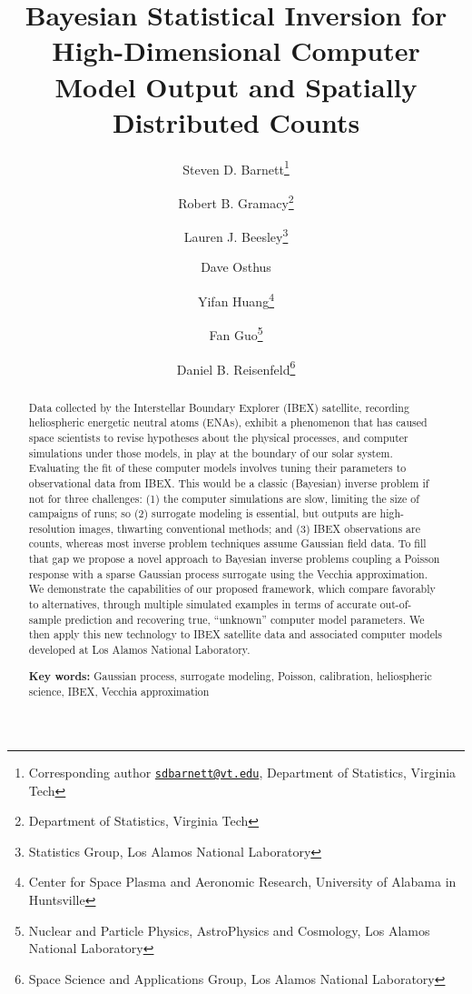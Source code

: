 \documentclass[11pt]{article}
\begin{document}
\title{Bayesian Statistical Inversion for High-Dimensional Computer Model
Output and Spatially Distributed Counts}
\author{Steven D. Barnett\thanks{Corresponding author
\href{mailto:sdbarnett@vt.edu}{\tt sdbarnett@vt.edu}, Department of Statistics,
Virginia Tech} \and Robert B. Gramacy\thanks{Department of Statistics, Virginia
Tech} \and Lauren J. Beesley\thanks{Statistics Group, Los Alamos National
Laboratory} \and Dave Osthus\footnotemark[3] \and Yifan Huang\thanks{ Center
for Space Plasma and Aeronomic Research, University of Alabama in Huntsville }
\and Fan Guo\thanks{Nuclear and Particle Physics, AstroPhysics and Cosmology,
Los Alamos National Laboratory} \and Daniel B. Reisenfeld\thanks{Space Science
and Applications Group, Los Alamos National Laboratory}}
\date{}

\maketitle

\begin{abstract}
Data collected by the Interstellar Boundary Explorer (IBEX) satellite,
recording heliospheric energetic neutral atoms (ENAs), exhibit a phenomenon
that has caused space scientists to revise hypotheses about the physical
processes, and computer simulations under those models, in play at the
boundary of our solar system.  Evaluating the fit of these computer models
involves tuning their parameters to observational data from IBEX. This would
be a classic (Bayesian) inverse problem if not for three challenges: (1) the
computer simulations are slow, limiting the size of campaigns of runs; so (2)
surrogate modeling is essential, but outputs are high-resolution images,
thwarting conventional methods; and (3) IBEX observations are counts, whereas
most inverse problem techniques assume Gaussian field data. To fill that gap
we propose a novel approach to Bayesian inverse problems coupling a Poisson
response with a sparse Gaussian process surrogate using the Vecchia
approximation.  We demonstrate the capabilities of our proposed framework,
which compare favorably to alternatives, through multiple simulated examples
{\color{red} in terms of accurate out-of-sample prediction and recovering true,
``unknown'' computer model parameters.} We then apply this new technology to
IBEX satellite data and associated computer models developed at Los Alamos
National Laboratory.

\bigskip
\noindent \textbf{Key words:} Gaussian process, surrogate modeling,
Poisson, calibration, heliospheric science, IBEX, Vecchia approximation
\end{abstract}
\end{document}
